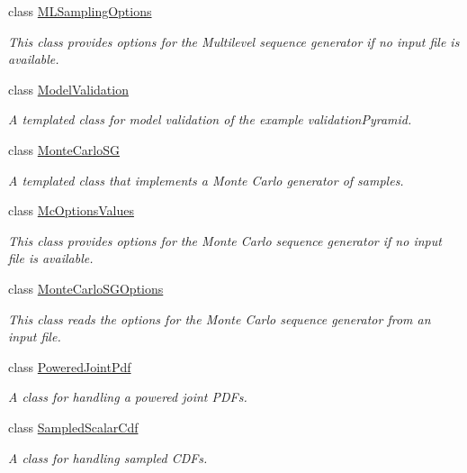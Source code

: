 \begin{DoxyCompactItemize}
class \hyperlink{class_q_u_e_s_o_1_1_m_l_sampling_options}{M\-L\-Sampling\-Options}
\begin{DoxyCompactList}\small\item\em This class provides options for the Multilevel sequence generator if no input file is available. \end{DoxyCompactList}\item 
class \hyperlink{class_q_u_e_s_o_1_1_model_validation}{Model\-Validation}
\begin{DoxyCompactList}\small\item\em A templated class for model validation of the example validation\-Pyramid. \end{DoxyCompactList}\item 
class \hyperlink{class_q_u_e_s_o_1_1_monte_carlo_s_g}{Monte\-Carlo\-S\-G}
\begin{DoxyCompactList}\small\item\em A templated class that implements a Monte Carlo generator of samples. \end{DoxyCompactList}\item 
class \hyperlink{class_q_u_e_s_o_1_1_mc_options_values}{Mc\-Options\-Values}
\begin{DoxyCompactList}\small\item\em This class provides options for the Monte Carlo sequence generator if no input file is available. \end{DoxyCompactList}\item 
class \hyperlink{class_q_u_e_s_o_1_1_monte_carlo_s_g_options}{Monte\-Carlo\-S\-G\-Options}
\begin{DoxyCompactList}\small\item\em This class reads the options for the Monte Carlo sequence generator from an input file. \end{DoxyCompactList}\item 
class \hyperlink{class_q_u_e_s_o_1_1_powered_joint_pdf}{Powered\-Joint\-Pdf}
\begin{DoxyCompactList}\small\item\em A class for handling a powered joint P\-D\-Fs. \end{DoxyCompactList}\item 
class \hyperlink{class_q_u_e_s_o_1_1_sampled_scalar_cdf}{Sampled\-Scalar\-Cdf}
\begin{DoxyCompactList}\small\item\em A class for handling sampled C\-D\-Fs. \end{DoxyCompactList}\item 

\end{DoxyCompactItemize}
